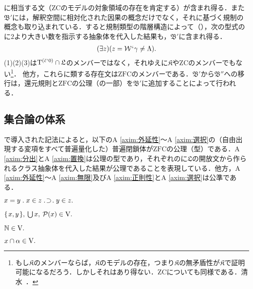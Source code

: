 に相当する文（$\mathrm{ZC}$のモデルの対象領域の存在を肯定する）が含まれ得る．また$\mathfrak{B}'$には，解釈空間に相対化された因果の概念だけでなく，それに基づく規制の概念も取り込まれている．すると規制類型の階層構造によって（），次の型式の\kagi{$ \gamma $}に$2$より大きい数を指示する抽象体を代入した結果も，$\mathfrak{B}'$に含まれ得る．
\begin{align}
    (\exists z)(z = \mathcal{W}{\mspace{1mu}{`}\mspace{1mu}} \gamma\neq\Lambda).
\end{align}
(1)(2)(3)は$\mathrm{T}^{(\breve{\epsilon}{\mspace{1mu}{`}\mspace{1mu}} 0)}\cap\mathfrak{L}$のメンバーではなく，それゆえに$\mathfrak{K}$や$\mathrm{ZC}$のメンバーでもない\footnote{
    もし$\mathfrak{K}$のメンバーならば，$\mathfrak{K}$のモデルの存在，つまり$\mathfrak{K}$の無矛盾性が$\mathfrak{K}$で証明可能になるだろう．しかしそれはあり得ない．$\mathrm{ZC}$についても同様である．清水~\cite[p.\,131,169]{清水}．
}．
他方，これらに類する存在文は$\mathrm{ZFC}$のメンバーである．$\mathfrak{B}'$から$\mathfrak{B}''$への移行は，還元規則と$\mathrm{ZFC}$の公理（の一部）を$\mathfrak{B}'$に追加することによって行われる．

\subsection{集合論の体系}
\label{ssec:集合論の体系}

で導入された記法によると，以下のA \ref{axim:外延性}〜A \ref{axim:選択}の（自由出現する変項をすべて普遍量化した）普遍閉鎖体が$\mathrm{ZFC}$の公理（型）である．A \ref{axim:分出}とA \ref{axim:置換}は公理の型であり，それぞれの\kagi{$ \alpha $}に$\mathfrak{L}$の開放文から作られるクラス抽象体を代入した結果が公理であることを表現している．他方，A \ref{axim:外延性}〜A \ref{axim:無限}及びA \ref{axim:正則性}とA \ref{axim:選択}は公準である．

\begin{axim}[外延性]
\label{axim:外延性}
$
    x=y\con{1}x\in z\case{1}{1}{1}y\in z.
$
\end{axim}

\begin{axim}[一対化，和，冪]
\label{axim:一対化，和，冪}
$
    \{\mspace{2mu}x,y\mspace{2mu}\},\:{\textstyle\bigcup}\mspace{3mu}x,\:\mathcal{P}(x)\in\mathrm{V}.
$
\end{axim}

\begin{axim}[無限]
\label{axim:無限}
$
    \mathbb{N}\in\mathrm{V}.
$
\end{axim}

\begin{axim}[分出]
\label{axim:分出}
$
    x\cap\alpha\in\mathrm{V}.
$
\end{axim}


